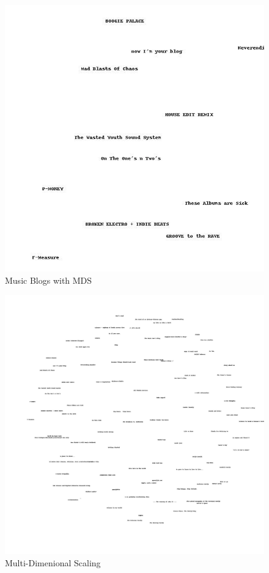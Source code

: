 \documentclass{article}
\begin{document}
\begin{figure}[H]
\centering
\includegraphics[scale=0.50]{q04/musicMDS}
\caption{Music Blogs with MDS}
\label{musicMDS}
\end{figure}

\begin{figure}[H]
\centering
\includegraphics[scale=0.20]{q04/blogs2d}
\caption{Multi-Dimenional Scaling}
\label{blogs2d}
\end{figure}
\end{document}
